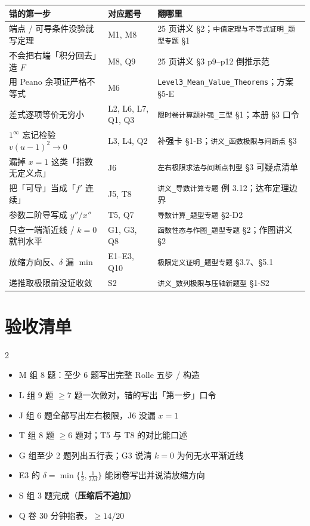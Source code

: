 \documentclass[11pt,a4paper]{ctexart}
\begin{document}
\begin{center}
\small\setlength{\tabcolsep}{4pt}
\begin{tabularx}{\linewidth}{l|l|l}
\toprule
错的第一步 & 对应题号 & 翻哪里 \\
\midrule
端点 / 可导条件没验就写定理 & M1, M8 & 25 页讲义 \S 2；\texttt{中值定理与不等式证明\_题型专题} \S 1 \\
不会把右端「积分回去」造 $F$ & M8, Q9 & 25 页讲义 \S 3 p9--p12 倒推示范 \\
用 Peano 余项证严格不等式 & M6 & \texttt{Level3\_Mean\_Value\_Theorems}；方案 \S 5-E \\
差式逐项等价无穷小 & L2, L6, L7, Q1, Q3 & \texttt{限时卷计算题补强\_三型} \S 1；本册 \S 3 口令 \\
$1^\infty$ 忘记检验 $v(u-1)^2\to0$ & L3, L4, Q2 & 补强卡 \S 1-B；\texttt{讲义\_函数极限与间断点} \S 3 \\
漏掉 $x=1$ 这类「指数无定义点」 & J6 & \texttt{左右极限求法与间断点判型} \S 3 可疑点清单 \\
把「可导」当成「$f'$ 连续」 & J5, T8 & \texttt{讲义\_导数计算专题} 例 3.12；达布定理边界 \\
参数二阶导写成 $y''/x''$ & T5, Q7 & \texttt{导数计算\_题型专题} \S 2-D2 \\
只查一端渐近线 / $k=0$ 就判水平 & G1, G3, Q8 & \texttt{函数性态与作图\_题型专题} \S 2；作图讲义 \S 2 \\
放缩方向反、$\delta$ 漏 $\min$ & E1--E3, Q10 & \texttt{极限定义证明\_题型专题} \S 3.7、\S 5.1 \\
递推取极限前没证收敛 & S2 & \texttt{讲义\_数列极限与压轴新题型} \S 1-S2 \\
\bottomrule
\end{tabularx}
\end{center}

\section{验收清单}

\begin{multicols}{2}
\begin{itemize}
\item[$\square$] M 组 8 题：至少 6 题写出完整 Rolle 五步 / 构造
\item[$\square$] L 组 9 题 $\geq7$ 题一次做对，错的写出「第一步」口令
\item[$\square$] J 组 6 题全部写出左右极限，J6 没漏 $x=1$
\item[$\square$] T 组 8 题 $\geq6$ 题对；T5 与 T8 的对比能口述
\item[$\square$] G 组至少 2 题列出五行表；G3 说清 $k=0$ 为何无水平渐近线
\item[$\square$] E3 的 $\delta=\min\{\frac12,\frac1{2M}\}$ 能闭卷写出并说清放缩方向
\item[$\square$] S 组 3 题完成（\textbf{压缩后不追加}）
\item[$\square$] Q 卷 30 分钟掐表，$\geq14/20$
\end{itemize}
\end{multicols}
\end{document}
